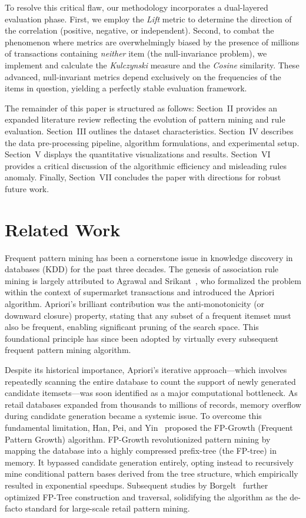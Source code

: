 \documentclass[conference]{IEEEtran}
\begin{document}
To resolve this critical flaw, our methodology incorporates a dual-layered evaluation phase. First, we employ the \textit{Lift} metric to determine the direction of the correlation (positive, negative, or independent). Second, to combat the phenomenon where metrics are overwhelmingly biased by the presence of millions of transactions containing \textit{neither} item (the null-invariance problem), we implement and calculate the \textit{Kulczynski} measure and the \textit{Cosine} similarity. These advanced, null-invariant metrics depend exclusively on the frequencies of the items in question, yielding a perfectly stable evaluation framework.

The remainder of this paper is structured as follows: Section~II provides an expanded literature review reflecting the evolution of pattern mining and rule evaluation. Section~III outlines the dataset characteristics. Section~IV describes the data pre-processing pipeline, algorithm formulations, and experimental setup. Section~V displays the quantitative visualizations and results. Section~VI provides a critical discussion of the algorithmic efficiency and misleading rules anomaly. Finally, Section~VII concludes the paper with directions for robust future work.

\section{Related Work}
Frequent pattern mining has been a cornerstone issue in knowledge discovery in databases (KDD) for the past three decades. The genesis of association rule mining is largely attributed to Agrawal and Srikant~\cite{b1}, who formalized the problem within the context of supermarket transactions and introduced the Apriori algorithm. Apriori's brilliant contribution was the anti-monotonicity (or downward closure) property, stating that any subset of a frequent itemset must also be frequent, enabling significant pruning of the search space. This foundational principle has since been adopted by virtually every subsequent frequent pattern mining algorithm.

Despite its historical importance, Apriori's iterative approach---which involves repeatedly scanning the entire database to count the support of newly generated candidate itemsets---was soon identified as a major computational bottleneck. As retail databases expanded from thousands to millions of records, memory overflow during candidate generation became a systemic issue. To overcome this fundamental limitation, Han, Pei, and Yin~\cite{b2} proposed the FP-Growth (Frequent Pattern Growth) algorithm. FP-Growth revolutionized pattern mining by mapping the database into a highly compressed prefix-tree (the FP-tree) in memory. It bypassed candidate generation entirely, opting instead to recursively mine conditional pattern bases derived from the tree structure, which empirically resulted in exponential speedups. Subsequent studies by Borgelt~\cite{b6} further optimized FP-Tree construction and traversal, solidifying the algorithm as the de-facto standard for large-scale retail pattern mining.
\end{document}
